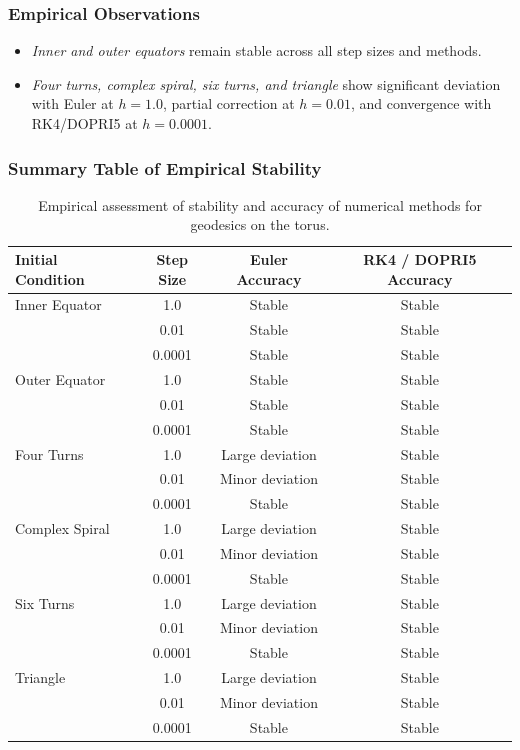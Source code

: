 \documentclass{article}
\begin{document}
	\subsubsection{Empirical Observations}
	
	\begin{itemize}
		\item \textit{Inner and outer equators} remain stable across all step sizes and methods.
		\item \textit{Four turns, complex spiral, six turns, and triangle} show significant deviation with Euler at \(h = 1.0\), partial correction at \(h = 0.01\), and convergence with RK4/DOPRI5 at \(h = 0.0001\).
	\end{itemize}
	
	\subsubsection{Summary Table of Empirical Stability}
	
	\begin{table}[H]
		\centering
		\begin{tabular}{lccc}
			\toprule
			\textbf{Initial Condition} & \textbf{Step Size} & \textbf{Euler Accuracy} & \textbf{RK4 / DOPRI5 Accuracy} \\
			\midrule
			Inner Equator & 1.0 & Stable & Stable \\
			& 0.01 & Stable & Stable \\
			& 0.0001 & Stable & Stable \\
			\midrule
			Outer Equator & 1.0 & Stable & Stable \\
			& 0.01 & Stable & Stable \\
			& 0.0001 & Stable & Stable \\
			\midrule
			Four Turns & 1.0 & Large deviation & Stable \\
			& 0.01 & Minor deviation & Stable \\
			& 0.0001 & Stable & Stable \\
			\midrule
			Complex Spiral & 1.0 & Large deviation & Stable \\
			& 0.01 & Minor deviation & Stable \\
			& 0.0001 & Stable & Stable \\
			\midrule
			Six Turns & 1.0 & Large deviation & Stable \\
			& 0.01 & Minor deviation & Stable \\
			& 0.0001 & Stable & Stable \\
			\midrule
			Triangle & 1.0 & Large deviation & Stable \\
			& 0.01 & Minor deviation & Stable \\
			& 0.0001 & Stable & Stable \\
			\bottomrule
		\end{tabular}
		\caption{Empirical assessment of stability and accuracy of numerical methods for geodesics on the torus.}
	\end{table}
	\newpage
\end{document}
